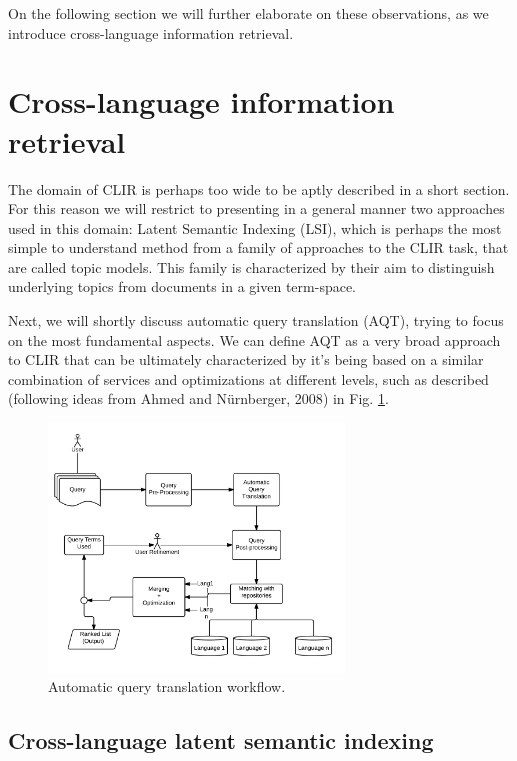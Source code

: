 \documentclass{llncs}
\begin{document}
On the following section we will further elaborate on these observations, as we introduce cross-language information retrieval.

\section{Cross-language information retrieval}

The domain of CLIR is perhaps too wide to be aptly described in a short section\cite{nie2010cross}. For this reason we will restrict to presenting in a general manner two approaches used in this domain: Latent Semantic Indexing (LSI), which is perhaps the most simple to understand method from a family of approaches to the CLIR task, that are called topic models. This family is characterized by their aim to distinguish underlying topics from documents in a given term-space. 

Next, we will shortly discuss automatic query translation (AQT), trying to focus on the most fundamental aspects. We can define AQT as a very broad approach to CLIR that can be ultimately characterized by it's being based on a similar combination of services and optimizations at different levels, such as described (following ideas from Ahmed and N\"{u}rnberger, 2008\cite{ahmed2008arabic}) in Fig. \ref{fig:AQTWorkflow}. 

\begin{figure}[h!]
  \centering
      \includegraphics[width=0.7\textwidth]{AQT.png}
  \caption{Automatic query translation workflow.}
\label{fig:AQTWorkflow}
\end{figure}

\subsection{Cross-language latent semantic indexing}
\end{document}
